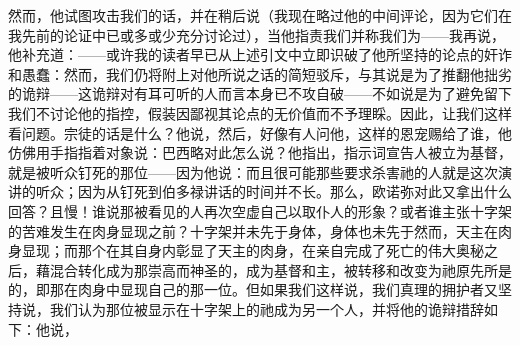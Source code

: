 然而，他试图攻击我们的话，并在稍后说（我现在略过他的中间评论，因为它们在我先前的论证中已或多或少充分讨论过），当他指责我们并称我们为——我再说，他补充道：——或许我的读者早已从上述引文中立即识破了他所坚持的论点的奸诈和愚蠢：然而，我们仍将附上对他所说之话的简短驳斥，与其说是为了推翻他拙劣的诡辩——这诡辩对有耳可听的人而言本身已不攻自破——不如说是为了避免留下我们不讨论他的指控，假装因鄙视其论点的无价值而不予理睬。因此，让我们这样看问题。宗徒的话是什么？他说，然后，好像有人问他，这样的恩宠赐给了谁，他仿佛用手指指着对象说：巴西略对此怎么说？他指出，指示词宣告人被立为基督，就是被听众钉死的那位——因为他说：而且很可能那些要求杀害祂的人就是这次演讲的听众；因为从钉死到伯多禄讲话的时间并不长。那么，欧诺弥对此又拿出什么回答？且慢！谁说那被看见的人再次空虚自己以取仆人的形象？或者谁主张十字架的苦难发生在肉身显现之前？十字架并未先于身体，身体也未先于然而，天主在肉身显现；而那个在其自身内彰显了天主的肉身，在亲自完成了死亡的伟大奥秘之后，藉混合转化成为那崇高而神圣的，成为基督和主，被转移和改变为祂原先所是的，即那在肉身中显现自己的那一位。但如果我们这样说，我们真理的拥护者又坚持说，我们认为那位被显示在十字架上的祂成为另一个人，并将他的诡辩措辞如下：他说，\par

